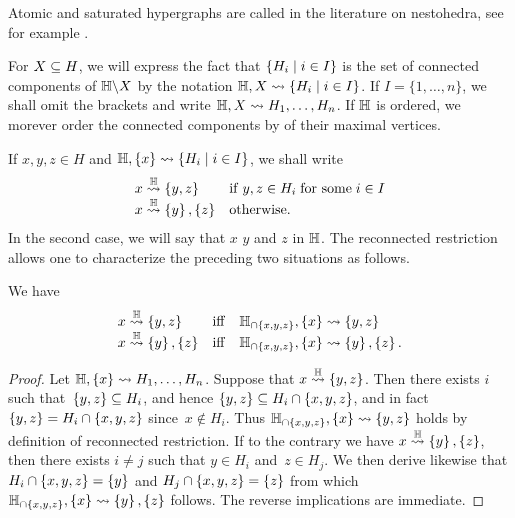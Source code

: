 \begin{remark}
    Atomic and saturated hypergraphs are called  in the  literature on nestohedra, see for example \cite{P09,FS05}.
\end{remark}

For $X\subseteq H$, we will express the fact that $\left\{H_i \mid i\in I\right\}$ is the set of connected components of ${\mathbb H}\backslash X$ by the notation ${\mathbb H},X  \leadsto  \left\{H_i \mid i\in I\right\}$. 
If $I=\{1,\ldots,n\}$, we shall omit the brackets and write ${\mathbb H},X  \leadsto  H_1,\ldots,H_n$.
If ${\mathbb H}$ is ordered, we morever order the connected components by  of their maximal vertices.

If  $x,y,z\in H$ and ${\mathbb H},\left\{x\right\}\leadsto \left\{H_i \mid i\in I\right\}$, we shall write
$$\begin{array}{ll}
x\stackrel{{\mathbb H}}{\rightsquigarrow}\left\{y,z\right\} & \mathrm{if}\; y,z\in H_i\; \mbox{for some}\; i \in I\\
x\stackrel{{\mathbb H}}{\rightsquigarrow}\left\{y\right\},\left\{z\right\} & \mbox{otherwise}.
\end{array}$$
In the second case, we will say that $x$  $y$ and $z$ in ${\mathbb H}$. 
The reconnected restriction allows one to characterize the preceding two situations as follows.

\begin{lemma} 
\label{xyz-reconnected} 
We have
$$\begin{array}{lll}
x\stackrel{{\mathbb H}}{\rightsquigarrow}\left\{y,z\right\} & \mathrm{iff} & {\mathbb H}_{\cap \left\{x,y,z\right\}},\left\{x\right\}\leadsto\left\{y,z\right\} \\
x\stackrel{{\mathbb H}}{\rightsquigarrow}\left\{y\right\},\left\{z\right\} & \mathrm{iff} & {\mathbb H}_{\cap \left\{x,y,z\right\}},\left\{x\right\}\leadsto \left\{y\right\},\left\{z\right\}.
\end{array}$$
\end{lemma}

\begin{proof} 
    Let ${\mathbb H},\left\{x\right\}\leadsto H_1,\ldots,H_n$. 
    Suppose that $x\stackrel{{\mathbb H}}{\rightsquigarrow}\left\{y,z\right\}$. 
    Then there exists $i$ such that~$\left\{y,z\right\}\subseteq H_i$, and hence $\left\{y,z\right\}\subseteq H_i\cap\left\{x,y,z\right\}$, and in fact $\left\{y,z\right\} = H_i\cap\left\{x,y,z\right\}$ since~$x\not\in H_i$. 
    Thus ${\mathbb H}_{\cap \left\{x,y,z\right\}},\left\{x\right\}\leadsto\left\{y,z\right\}$ holds by definition of reconnected restriction.
    If to the contrary we have $x\stackrel{{\mathbb H}}{\rightsquigarrow}\left\{y\right\},\left\{z\right\}$, then there exists $i\neq j$ such that $y\in H_i$ and~$z\in H_j$. 
    We then derive likewise that $H_i\cap\left\{x,y,z\right\}=\left\{y\right\}$ and $H_j\cap\left\{x,y,z\right\}=\left\{z\right\}$ from which $ {\mathbb H}_{\cap \left\{x,y,z\right\}},\left\{x\right\}\leadsto \left\{y\right\},\left\{z\right\}$ follows.
    The reverse implications are immediate.
\end{proof}


